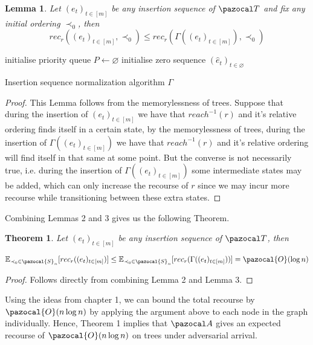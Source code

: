 \documentclass{article}
\newtheorem{theorem}{Theorem}
\newtheorem{lemma}{Lemma}
\begin{document}
\begin{lemma}
Let $(e_t)_{t \in [m]}$ be any insertion sequence of $\pazocal T$ and fix any initial ordering $\prec_0$, then 
\[ rec_r((e_t)_{t \in [m]}, \prec_0) \leq rec_r(\Gamma((e_t)_{t \in [m]}), \prec_0) \]
\end{lemma}

\begin{algorithm}[H]
    \SetAlgoLined
    
    initialise priority queue $P \leftarrow \varnothing$\;
    initialise zero sequence $(\hat e_t)_{t \in \varnothing}$\;
    \caption{Insertion sequence normalization algorithm $\Gamma$}
\end{algorithm}

\begin{proof}
This Lemma follows from the memorylessness of trees. Suppose that during the insertion of $(e_t)_{t \in [m]}$ we have that $reach^{-1}(r)$ and it's relative ordering finds itself in a certain state, by the memorylessness of trees, during the insertion of $\Gamma((e_t)_{t \in [m]})$ we have that $reach^{-1}(r)$ and it's relative ordering will find itself in that same at some point. But the converse is not necessarily true, i.e. during the insertion of $\Gamma((e_t)_{t \in [m]})$ some intermediate states may be added, which can only increase the recourse of $r$ since we may incur more recourse while transitioning between these extra states.
\end{proof}

Combining Lemmas 2 and 3 gives us the following Theorem.

\begin{theorem}
Let $(e_t)_{t \in [m]}$ be any insertion sequence of $\pazocal T$, then

\[ \mathbb{E}_{\prec_0 \in \pazocal{S}_n}[ rec_r((e_t)_{t \in [m]})] \leq \mathbb{E}_{\prec_0 \in \pazocal{S}_n}[ rec_r(\Gamma((e_t)_{t \in [m]}))] = \pazocal{O}(\log n) \]
\end{theorem}

\begin{proof}
Follows directly from combining Lemma 2 and Lemma 3.
\end{proof}

Using the ideas from chapter 1, we can bound the total recourse by $\pazocal{O}(n \log n)$ by applying the argument above to each node in the graph individually. Hence, Theorem 1 implies that $\pazocal A$ gives an expected recourse of $\pazocal{O}(n \log n)$ on trees under adversarial arrival.
\end{document}
